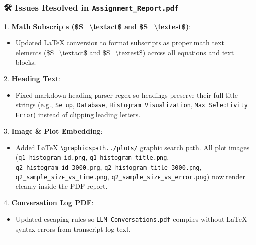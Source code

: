 \documentclass[11pt,a4paper]{article}
\begin{document}
{{{\subsubsection{🛠️ Issues Resolved in \texttt{Assignment\_Report.pdf}}

1. \textbf{Math Subscripts (\$S\_{\textbackslash{}text{act}}\$ and \$S\_{\textbackslash{}text{est}}\$)}:

\begin{itemize}
\item Updated LaTeX conversion to format subscripts as proper math text elements (\$S\_{\textbackslash{}text{act}}\$ and \$S\_{\textbackslash{}text{est}}\$) across all equations and text blocks.
\end{itemize}

2. \textbf{Heading Text}:

\begin{itemize}
\item Fixed markdown heading parser regex so headings preserve their full title strings (e.g., \texttt{Setup}, \texttt{Database}, \texttt{Histogram Visualization}, \texttt{Max Selectivity Error}) instead of clipping leading letters.
\end{itemize}

3. \textbf{Image \& Plot Embedding}:

\begin{itemize}
\item Added LaTeX \texttt{\textbackslash{}graphicspath{{../plots/}}} graphic search path. All plot images (\texttt{q1\_histogram\_id.png}, \texttt{q1\_histogram\_title.png}, \texttt{q2\_histogram\_id\_3000.png}, \texttt{q2\_histogram\_title\_3000.png}, \texttt{q2\_sample\_size\_vs\_time.png}, \texttt{q2\_sample\_size\_vs\_error.png}) now render cleanly inside the PDF report.
\end{itemize}

4. \textbf{Conversation Log PDF}:

\begin{itemize}
\item Updated escaping rules so \texttt{LLM\_Conversations.pdf} compiles without LaTeX syntax errors from transcript log text.
\end{itemize}

\hrule


}}}
\end{document}

